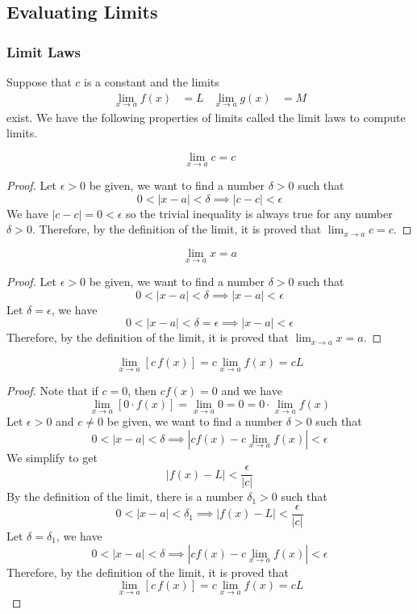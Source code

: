 \subsection{Evaluating Limits}

\subsubsection*{Limit Laws}
Suppose that \(c\) is a constant and the limits
\begin{align*}
    \lim_{x\to a}f(x) &= L & \lim_{x\to a}g(x) &= M
\end{align*}
exist.
We have the following properties of limits called the limit laws to compute
limits.
\begin{theorem}
    \[\lim_{x\to a}c=c\]
\end{theorem}
\begin{proof}
    Let \(\epsilon>0\) be given, we want to find a number \(\delta>0\) such
    that
    \[0<|x-a|<\delta\implies|c-c|<\epsilon\]
    We have \(|c-c|=0<\epsilon\) so the trivial inequality is always true for
    any number \(\delta>0\).
    Therefore, by the definition of the limit, it is proved that
    \(\lim_{x\to a}c=c\).
\end{proof}
\begin{theorem}
    \[\lim_{x\to a}x=a\]
\end{theorem}
\begin{proof}
    Let \(\epsilon>0\) be given, we want to find a number \(\delta>0\) such
    that \[0<|x-a|<\delta\implies|x-a|<\epsilon\]
    Let \(\delta=\epsilon\), we have
    \[0<|x-a|<\delta=\epsilon\implies|x-a|<\epsilon\]
    Therefore, by the definition of the limit, it is proved that
    \(\lim_{x\to a}x=a\).
\end{proof}
\begin{theorem}
    \[\lim_{x\to a}[c\,f(x)]=c\lim_{x\to a}f(x)=cL\]
\end{theorem}
\begin{proof}
    Note that if \(c=0\), then \(cf(x)=0\) and we have
    \[\lim_{x\to a}[0\cdot f(x)]=\lim_{x\to a}0=0=0\cdot\lim_{x\to a}f(x)\]
    Let \(\epsilon>0\) and \(c\neq0\) be given, we want to find a number
    \(\delta>0\) such that
    \[0<|x-a|<\delta\implies|cf(x)-c\lim_{x\to a}f(x)|<\epsilon\]
    We simplify to get
    \[|f(x)-L|<\frac{\epsilon}{|c|}\]
    By the definition of the limit, there is a number \(\delta_1>0\) such that
    \[0<|x-a|<\delta_1\implies|f(x)-L|<\frac{\epsilon}{|c|}\]
    Let \(\delta=\delta_1\), we have
    \[0<|x-a|<\delta\implies|cf(x)-c\lim_{x\to a}f(x)|<\epsilon\]
    Therefore, by the definition of the limit, it is proved that
    \[\lim_{x\to a}[c\,f(x)]=c\lim_{x\to a}f(x)=cL\]
\end{proof}
